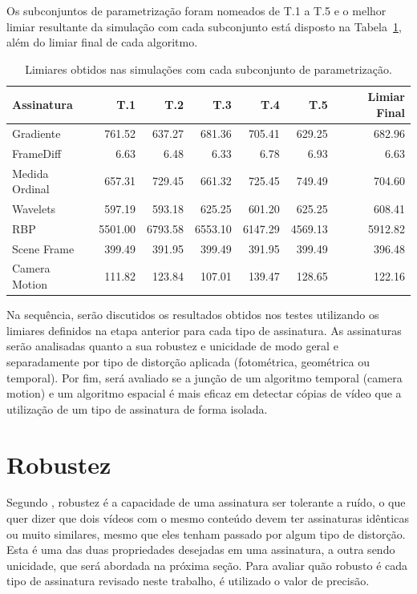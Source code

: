 Os subconjuntos de parametrização foram nomeados de T.1 a T.5 e o melhor limiar resultante da simulação com cada subconjunto está disposto na Tabela~\ref{tab:limiares}, além do limiar final de cada algoritmo.

\begin{table}[h]
	\caption{Limiares obtidos nas simulações com cada subconjunto de parametrização.}
	\label{tab:limiares}
	\begin{tabular}{|l|r|r|r|r|r|r|}
		\hline
		\textbf{Assinatura} & \textbf{T.1} & \textbf{T.2} & \textbf{T.3} & \textbf{T.4} & \textbf{T.5} & \textbf{Limiar Final}\\ \hline
		Gradiente & 761.52 & 637.27 & 681.36 & 705.41 & 629.25 & 682.96\\ \hline
		FrameDiff & 6.63 & 6.48 & 6.33 & 6.78 & 6.93 & 6.63\\ \hline
		Medida Ordinal & 657.31 & 729.45 & 661.32 & 725.45 & 749.49 & 704.60\\ \hline
		Wavelets & 597.19 & 593.18 & 625.25 & 601.20 & 625.25 & 608.41\\ \hline
		RBP & 5501.00 & 6793.58 & 6553.10 & 6147.29 & 4569.13 & 5912.82\\ \hline
		Scene Frame & 399.49 & 391.95 & 399.49 & 391.95 & 399.49 & 396.48\\ \hline
		Camera Motion & 111.82 & 123.84 & 107.01 & 139.47 & 128.65 & 122.16\\ \hline
	\end{tabular}
\end{table}

Na sequência, serão discutidos os resultados obtidos nos testes utilizando os limiares definidos na etapa anterior para cada tipo de assinatura. As assinaturas serão analisadas quanto a sua robustez e unicidade de modo geral e separadamente por tipo de distorção aplicada (fotométrica, geométrica ou temporal). Por fim, será avaliado se a junção de um algoritmo temporal (camera motion) e um algoritmo espacial é mais eficaz em detectar cópias de vídeo que a utilização de um tipo de assinatura de forma isolada. 

\section{Robustez}

Segundo \citeauthor{hua2004robust}, robustez é a capacidade de uma assinatura ser tolerante a ruído, o que quer dizer que dois vídeos com o mesmo conteúdo devem ter assinaturas idênticas ou muito similares, mesmo que eles tenham passado por algum tipo de distorção. Esta é uma das duas propriedades desejadas em uma assinatura, a outra sendo unicidade, que será abordada na próxima seção. Para avaliar quão robusto é cada tipo de assinatura revisado neste trabalho, é utilizado o valor de precisão.

